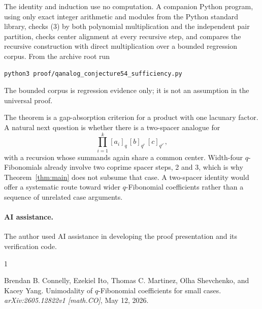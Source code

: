 \documentclass[11pt]{article}
\begin{document}
The identity and induction use no computation.  A companion Python program,
using only exact integer arithmetic and modules from the Python standard
library, checks (3) by both polynomial multiplication and the independent
pair partition, checks center alignment at every recursive step, and compares
the recursive construction with direct multiplication over a bounded
regression corpus.  From the archive root run
\begin{verbatim}
python3 proof/qanalog_conjecture54_sufficiency.py
\end{verbatim}
The bounded corpus is regression evidence only; it is not an assumption in
the universal proof.

The theorem is a gap-absorption criterion for a product with one lacunary
factor.  A natural next question is whether there is a two-spacer analogue
for
\[
 \prod_{i=1}^k[a_i]_q\,[b]_{q^r}\,[c]_{q^{r'}},
\]
with a recursion whose summands again share a common center.  Width-four
\(q\)-Fibonomials already involve two coprime spacer steps, 2 and 3, which is
why Theorem~\ref{thm:main} does not subsume that case.  A two-spacer identity
would offer a systematic route toward wider \(q\)-Fibonomial coefficients
rather than a sequence of unrelated case arguments.

\enlargethispage{4\baselineskip}
\paragraph{AI assistance.}
The author used AI assistance in developing the proof presentation and its
verification code.

\begin{thebibliography}{1}

Brendan B. Connelly, Ezekiel Ito, Thomas C. Martinez, Olha Shevchenko, and
Kacey Yang.
\newblock Unimodality of \(q\)-Fibonomial coefficients for small cases.
\newblock \emph{arXiv:2605.12822v1 [math.CO]}, May 12, 2026.

\end{thebibliography}
\end{document}
